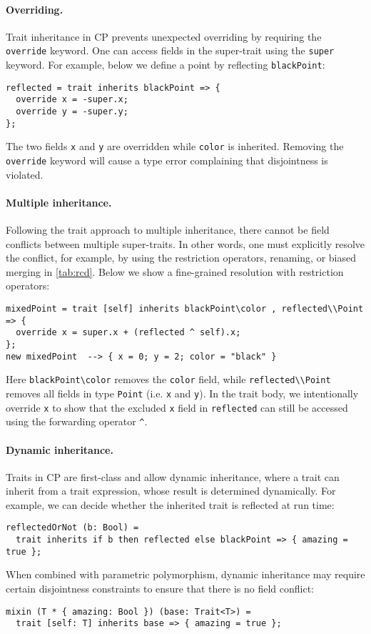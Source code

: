 \paragraph{Overriding.}
Trait inheritance in CP prevents unexpected overriding by requiring the
\lstinline{override} keyword. One can access fields in the super-trait using the
\lstinline{super} keyword. For example, below we define a point by reflecting
\lstinline{blackPoint}:
\begin{lstlisting}
reflected = trait inherits blackPoint => {
  override x = -super.x;
  override y = -super.y;
};
\end{lstlisting}
The two fields \lstinline{x} and \lstinline{y} are overridden while
\lstinline{color} is inherited. Removing the \lstinline{override} keyword will
cause a type error complaining that disjointness is violated.

\paragraph{Multiple inheritance.}
Following the trait approach to multiple inheritance, there cannot be field
conflicts between multiple super-traits. In other words, one must explicitly
resolve the conflict, for example, by using the restriction operators, renaming,
or biased merging in \autoref{tab:rcd}. Below we show a fine-grained resolution
with restriction operators:
\begin{lstlisting}
mixedPoint = trait [self] inherits blackPoint\color , reflected\\Point => {
  override x = super.x + (reflected ^ self).x;
};
new mixedPoint  --> { x = 0; y = 2; color = "black" }
\end{lstlisting}
Here \lstinline{blackPoint\color} removes the \lstinline{color} field, while
\lstinline{reflected\\Point} removes all fields in type \lstinline{Point} (i.e.
\lstinline{x} and \lstinline{y}). In the trait body, we intentionally override
\lstinline{x} to show that the excluded \lstinline{x} field in
\lstinline{reflected} can still be accessed using the forwarding operator
\lstinline{^}.

\paragraph{Dynamic inheritance.}
Traits in CP are first-class and allow dynamic inheritance, where
a trait can inherit from a trait expression, whose result is determined
dynamically. For example, we can decide whether the inherited trait is reflected
at run time:
\begin{lstlisting}
reflectedOrNot (b: Bool) =
  trait inherits if b then reflected else blackPoint => { amazing = true };
\end{lstlisting}
When combined with parametric polymorphism, dynamic inheritance may require
certain disjointness constraints to ensure that there is no field conflict:
\begin{lstlisting}
mixin (T * { amazing: Bool }) (base: Trait<T>) =
  trait [self: T] inherits base => { amazing = true };
\end{lstlisting}


